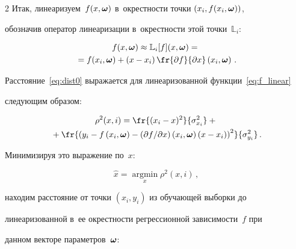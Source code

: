 \begin{multicols}{2}
Итак, линеаризуем~$f(x, \boldsymbol{\omega})$ в~окрестности точки $(x_i, f(x_i, \boldsymbol{\omega}))$,

обозначив оператор линеаризации в~окрестности этой точки~$\mathbb{L}_i$:

\begin{multline}

  f(x, \bomega) \approx \mathbb{L}_{i}[f](x, \bomega) = {}\\

  {}=f(x_i, \bomega) + \left(x - 

x_i\right) \fr{\partial f}{\partial x}\left(x_i, \bomega\right)\,.

  \label{eq:f_linear}

\end{multline}

Расстояние~\eqref{eq:dist0} выражается для линеаризованной функции~\eqref{eq:f_linear} 

сле\-ду\-ющим образом:



\noindent

\begin{multline*}

  \rho^2(x, i) = \fr{(x_i - x)^2}{\sigma_{x_i}^2} +{}\\

  {}+ \fr{\left(y_i - f\left(x_i, 

\bomega\right) - ({\partial f}/{\partial x})\left(x_i, \bomega\right) \left(x - 

x_i\right)\right)^2}{\sigma_{y_i}^2}\,.


\end{multline*}

Минимизируя это выражение по~$x$:



\noindent

$$

  \hat{x} = \mathop{\arg \min}\limits_x \rho^2(x, i)\,,

$$

находим расстояние от точки $(x_i, y_i)$ из обуча\-ющей выборки до

линеаризованной в~ее окрест\-ности регрессионной за\-ви\-си\-мости~$f$ при

данном векторе па\-ра\-мет\-ров~$\boldsymbol{\omega}$:



\noindent

\begin{multline}


\end{multline}
\end{multicols}
